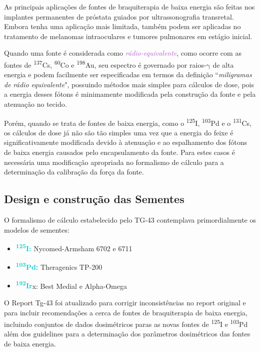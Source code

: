 \documentclass[11pt,a4paper]{article}
\begin{document}
		As principais aplicações de fontes de braquiterapia de baixa energia são feitas nos implantes permanentes de próstata guiados por ultrassonografia transretal. Embora tenha uma aplicação mais limitada, também podem ser aplicadas no tratamento de melanomas intraoculares e tumores pulmonares em estágio inicial.

		Quando uma fonte é considerada como \textit{\textcolor{MediumOrchid}{rádio-equivalente}}, como ocorre com as fontes de \textsuperscript{137}Cs, \textsuperscript{60}Co e \textsuperscript{198}Au, seu espectro é governado por raios-$\mathrm{\gamma}$ de alta energia e podem facilmente ser especificadas em termos da definição ``\textit{miligramas de rádio equivalente}", possuindo métodos mais simples para cálculos de dose, pois a energia desses fótons é minimamente modificada pela construção da fonte e pela atenuação no tecido. 

		Porém, quando se trata de fontes de baixa energia, como o \textsuperscript{125}I, \textsuperscript{103}Pd e o \textsuperscript{131}Cs, os cálculos de dose já não são tão simples uma vez que a energia do feixe é significativamente modificada devido à atenuação e ao espalhamento dos fótons de baixa energia causados pelo encapsulamento da fonte. Para estes casos é necessária uma modificação apropriada no formalismo de cálculo para a determinação da calibração da força da fonte.

\subsection*{Design e construção das Sementes}

			O formalismo de cálculo estabelecido pelo TG-43 contemplava primordialmente os modelos de sementes:

				\begin{itemize}
					\item \textcolor{DarkTurquoise}{\textbf{\textsuperscript{125}I:}} Nycomed-Armsham 6702 e 6711
					\item \textcolor{DarkTurquoise}{\textbf{\textsuperscript{103}Pd:}} Theragenics TP-200
					\item \textcolor{DarkTurquoise}{\textbf{ \textsuperscript{192}Ir}}x: Best Medial e Alpha-Omega
				\end{itemize}
			
			O Report Tg-43 foi atualizado para corrigir inconsistências no report original e para incluir recomendações a cerca de fontes de braquiterapia de baixa energia, incluindo conjuntos de dados dosimétricos paras as novas fontes de \textsuperscript{125}I e \textsuperscript{103}Pd além dos guidelines para a determinação dos parâmetros dosimétricos das fontes de baixa energia.
\end{document}
